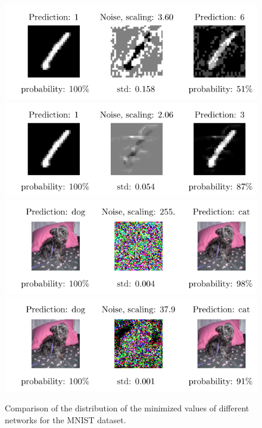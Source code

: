 \documentclass[%
 reprint,
 amsmath,amssymb,
 aps,
]{revtex4-1}
\begin{document}
\begin{figure}
\centering
\showthe\columnwidth
\includegraphics[width = 1\linewidth]{figures/mnist_model2_I0_f0277.pdf}
\includegraphics[width = 1\linewidth]{figures/adv_example_minimizer_mnist_0.pdf}
\includegraphics[width = 1\linewidth]{figures/cvd_model9_I0_f0003.pdf}
\includegraphics[width = 1\linewidth]{figures/adv_example_minimizer_dogs_vs_cats_0.pdf}
\caption{Comparison of the distribution of the minimized values of different networks for the MNIST dataset.}
\label{fig:examples}
\end{figure}
\end{document}
